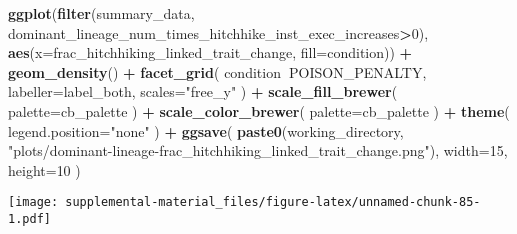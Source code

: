 \documentclass[]{book}
\newenvironment{Shaded}{\begin{snugshade}}{\end{snugshade}}
\newcommand{\DataTypeTok}[1]{\textcolor[rgb]{0.13,0.29,0.53}{#1}}
\newcommand{\DecValTok}[1]{\textcolor[rgb]{0.00,0.00,0.81}{#1}}
\newcommand{\KeywordTok}[1]{\textcolor[rgb]{0.13,0.29,0.53}{\textbf{#1}}}
\newcommand{\NormalTok}[1]{#1}
\newcommand{\OperatorTok}[1]{\textcolor[rgb]{0.81,0.36,0.00}{\textbf{#1}}}
\newcommand{\StringTok}[1]{\textcolor[rgb]{0.31,0.60,0.02}{#1}}
\begin{document}
\begin{Shaded}
\begin{Highlighting}[]
\KeywordTok{ggplot}\NormalTok{(}\KeywordTok{filter}\NormalTok{(summary_data, dominant_lineage_num_times_hitchhike_inst_exec_increases}\OperatorTok{>}\DecValTok{0}\NormalTok{), }\KeywordTok{aes}\NormalTok{(}\DataTypeTok{x=}\NormalTok{frac_hitchhiking_linked_trait_change, }\DataTypeTok{fill=}\NormalTok{condition)) }\OperatorTok{+}
\StringTok{  }\KeywordTok{geom_density}\NormalTok{() }\OperatorTok{+}
\StringTok{  }\KeywordTok{facet_grid}\NormalTok{(}
\NormalTok{    condition}\OperatorTok{~}\NormalTok{POISON_PENALTY,}
    \DataTypeTok{labeller=}\NormalTok{label_both,}
    \DataTypeTok{scales=}\StringTok{"free_y"}
\NormalTok{  ) }\OperatorTok{+}
\StringTok{  }\KeywordTok{scale_fill_brewer}\NormalTok{(}
    \DataTypeTok{palette=}\NormalTok{cb_palette}
\NormalTok{  ) }\OperatorTok{+}
\StringTok{  }\KeywordTok{scale_color_brewer}\NormalTok{(}
    \DataTypeTok{palette=}\NormalTok{cb_palette}
\NormalTok{  ) }\OperatorTok{+}
\StringTok{  }\KeywordTok{theme}\NormalTok{(}
    \DataTypeTok{legend.position=}\StringTok{"none"}
\NormalTok{  ) }\OperatorTok{+}
\StringTok{  }\KeywordTok{ggsave}\NormalTok{(}
    \KeywordTok{paste0}\NormalTok{(working_directory, }\StringTok{"plots/dominant-lineage-frac_hitchhiking_linked_trait_change.png"}\NormalTok{),}
    \DataTypeTok{width=}\DecValTok{15}\NormalTok{,}
    \DataTypeTok{height=}\DecValTok{10}
\NormalTok{  )}
\end{Highlighting}
\end{Shaded}

\texttt{[image: supplemental-material\_files/figure-latex/unnamed-chunk-85-1.pdf]}
\end{document}
